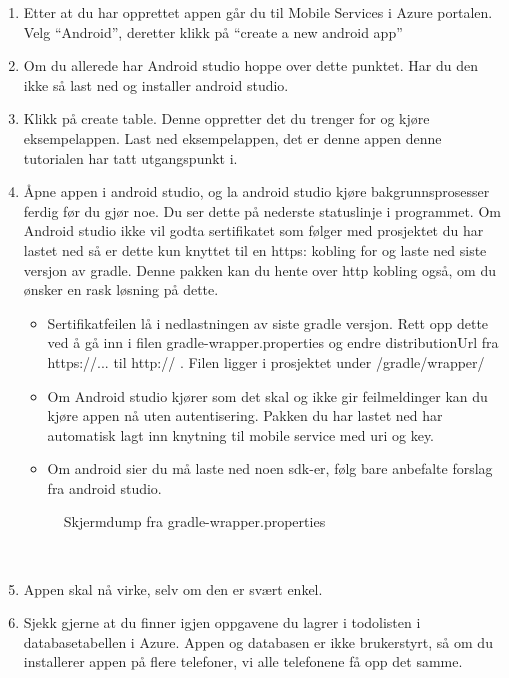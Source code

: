 \begin{enumerate}
\item Etter at du har opprettet appen går du til Mobile Services i Azure portalen. Velg “Android”, deretter klikk på “create a new android app”
\\
\item Om du allerede har Android studio hoppe over dette punktet. Har du den ikke så last ned og installer android studio.
\\
\item Klikk på create table. Denne oppretter det du trenger for og kjøre eksempelappen. Last ned eksempelappen, det er denne appen denne tutorialen har tatt utgangspunkt i.
\\
\item Åpne appen i android studio, og la android studio kjøre bakgrunnsprosesser ferdig før du gjør noe. Du ser dette på nederste statuslinje i programmet. 
Om Android studio ikke vil godta sertifikatet som følger med prosjektet du har lastet ned så er dette kun knyttet til en https: kobling for og laste ned siste versjon av gradle. Denne pakken kan du hente over http kobling også, om du ønsker en rask løsning på dette.
\\
\begin{itemize}
\item Sertifikatfeilen lå i nedlastningen av siste gradle versjon. Rett opp dette ved å gå inn i filen gradle-wrapper.properties og endre distributionUrl fra https://... til http:// . Filen ligger i prosjektet under /gradle/wrapper/
\item Om Android studio kjører som det skal og ikke gir feilmeldinger kan du kjøre appen nå uten autentisering. Pakken du har lastet ned har automatisk lagt inn knytning til mobile service med uri og key. 
\item Om android sier du må laste ned noen sdk-er, følg bare anbefalte forslag fra android studio. 
\end{itemize}
\bigskip
\begin{figure}[H]
    \centering
    \setlength{\fboxsep}{0pt}%
    \setlength{\fboxrule}{1pt}%
    \caption{Skjermdump fra gradle-wrapper.properties}
\end{figure}

\\
\item Appen skal nå virke, selv om den er svært enkel. 
\\
\item Sjekk gjerne at du finner igjen oppgavene du lagrer i todolisten i databasetabellen i Azure. Appen og databasen er ikke brukerstyrt, så om du installerer appen på flere telefoner, vi alle telefonene få opp det samme.
\end{enumerate}

